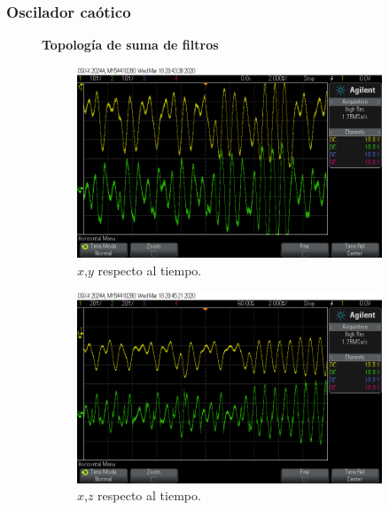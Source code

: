 \documentclass[10pt]{beamer}
\begin{document}
	\begin{frame}
		\frametitle{Oscilador caótico}
		\begin{figure}[!ht]
		\textbf{Topología de suma de filtros}
	\caption{Respuesta en el dominio temporal de oscilador caótico con $\alpha = 0.8$ y dos enrollamientos.}
	\label{fig:temporal_imp}
	  \begin{subfigure}[b]{0.3\textwidth}
	    \includegraphics[trim={6cm 2cm 9cm 2cm},clip,width=\textwidth]{../imagenes/Y3p_X_vs_Y_signal.png}
	    \caption{$x$,$y$ respecto al tiempo.}
	    \label{fig:Y3p_X_vs_Y_signal}
	  \end{subfigure}
	  \hfill
	  \begin{subfigure}[b]{0.3\textwidth}
	    \includegraphics[trim={6cm 2cm 9cm 2cm},clip,width=\textwidth]{../imagenes/Y5p_X_vs_Z_signal.png}
	    \caption{$x$,$z$ respecto al tiempo.}
	    \label{fig:Y5p_X_vs_Z_signal}
	  \end{subfigure}
	  \hfill
	  \begin{subfigure}[b]{0.3\textwidth}

\end{subfigure}
\end{figure}
\end{frame}
\end{document}
